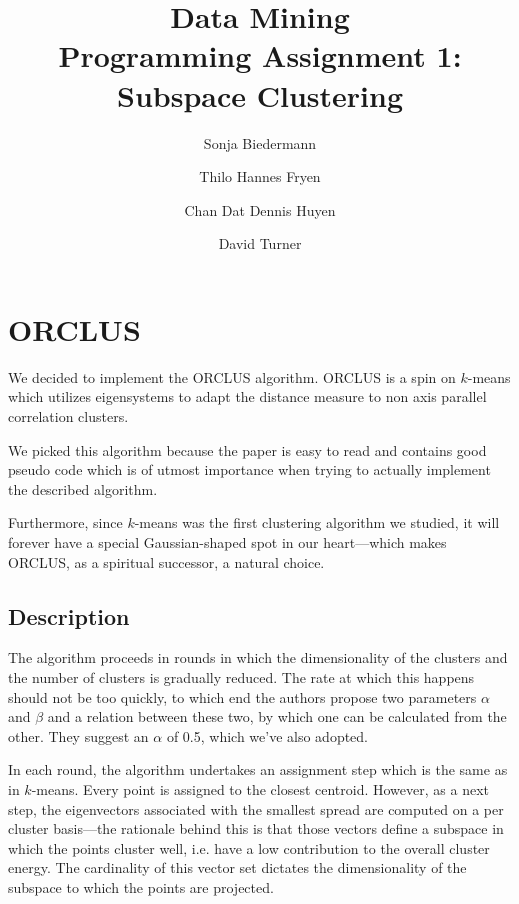 \documentclass[english]{scrartcl}
\begin{document}
\title{Data Mining\\Programming Assignment 1: Subspace Clustering}

\author{Sonja Biedermann \and Thilo Hannes Fryen \and Chan Dat Dennis Huyen \and David Turner}

\maketitle
\tableofcontents

\section{ORCLUS}

We decided to implement the ORCLUS algorithm. ORCLUS is a spin on $k$-means
which utilizes eigensystems to adapt the distance measure to non axis parallel
correlation clusters.

We picked this algorithm because the paper is easy to read and contains good
pseudo code which is of utmost importance when trying to actually implement
the described algorithm.

Furthermore, since $k$-means was the first clustering algorithm we studied, it will forever
have a special Gaussian-shaped spot in our heart---which makes ORCLUS, as a
spiritual successor, a natural choice.

\subsection{Description}

The algorithm proceeds in rounds in which the dimensionality of the clusters
and the number of clusters is gradually reduced. The rate at which this happens should
not be too quickly, to which end the authors propose two parameters $\alpha$ and $\beta$
and a relation between these two, by which one can be calculated from the other. They
suggest an $\alpha$ of 0.5, which we've also adopted.

In each round, the algorithm undertakes an assignment step which is the same as
in $k$-means. Every point is assigned to the closest centroid. However, as a
next step, the eigenvectors associated with the smallest spread are computed on
a per cluster basis---the rationale behind this is that those vectors define a
subspace in which the points cluster well, i.e. have a low contribution to the
overall cluster energy. The cardinality of this vector set dictates the dimensionality
of the subspace to which the points are projected.
\end{document}
